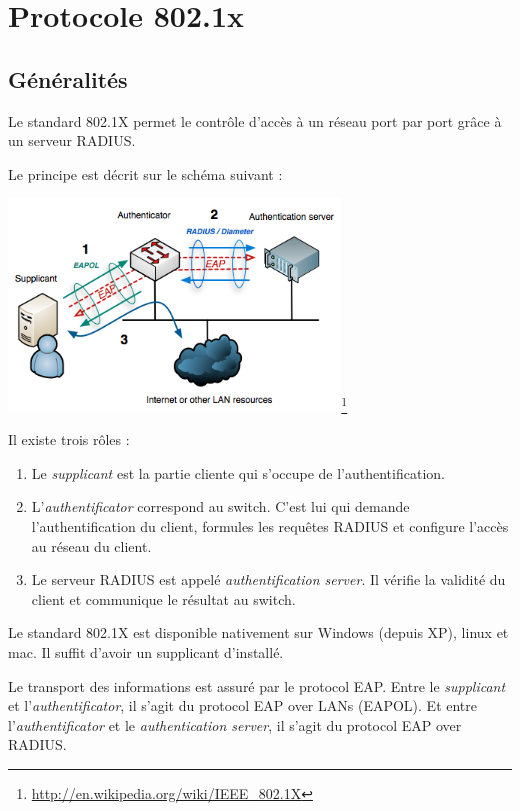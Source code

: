 \section{Protocole 802.1x}
\label{dot1x}
\subsection{Généralités}

Le standard 802.1X permet le contrôle d'accès à un réseau port par port grâce à un serveur RADIUS.

Le principe est décrit sur le schéma suivant :\\
\begin{center}
\includegraphics[width=250pt]{img/schema-dot1x.png}\footnote{\url{http://en.wikipedia.org/wiki/IEEE_802.1X}}
\end{center}

Il existe trois rôles :
\begin{enumerate}
\item Le \textit{supplicant} est la partie cliente qui s'occupe de l'authentification.
\item L'\textit{authentificator} correspond au switch. C'est lui qui demande l'authentification du client, formules les requêtes RADIUS et configure l'accès au réseau du client.
\item Le serveur RADIUS est appelé \textit{authentification server}. Il vérifie la validité du client et communique le résultat au switch.
\end{enumerate}

Le standard 802.1X est disponible nativement sur Windows (depuis XP), linux et mac. Il suffit d'avoir un supplicant d'installé.

Le transport des informations est assuré par le protocol EAP. Entre le \textit{supplicant} et l'\textit{authentificator}, il s'agit du protocol EAP over LANs (EAPOL). Et entre l'\textit{authentificator} et le \textit{authentication server}, il s'agit du protocol EAP over RADIUS.

